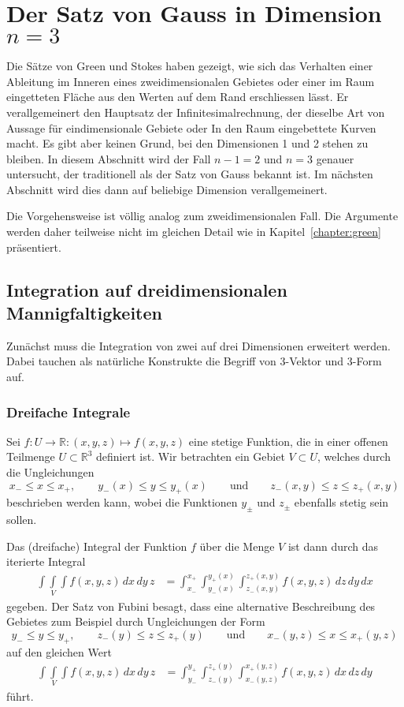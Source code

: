 %
%
\section{Der Satz von Gauss in Dimension $n=3$
\label{buch:gauss:section:dimension3}}
Die Sätze von Green und Stokes haben gezeigt, wie sich das Verhalten
einer Ableitung im Inneren eines zweidimensionalen Gebietes oder
einer im Raum eingetteten Fläche aus den Werten auf dem Rand erschliessen
lässt.
Er verallgemeinert den Hauptsatz der Infinitesimalrechnung, der dieselbe
Art von Aussage für eindimensionale Gebiete oder In den Raum eingebettete
Kurven macht.
Es gibt aber keinen Grund, bei den Dimensionen 1 und 2 stehen zu bleiben.
In diesem Abschnitt wird der Fall $n-1=2$ und $n=3$ genauer untersucht,
der traditionell als der Satz von Gauss bekannt ist.
Im nächsten Abschnitt wird dies dann auf beliebige Dimension verallgemeinert.

Die Vorgehensweise ist völlig analog zum zweidimensionalen Fall.
Die Argumente werden daher teilweise nicht im gleichen Detail
wie in Kapitel~\ref{chapter:green} präsentiert.

%
%
\subsection{Integration auf dreidimensionalen Mannigfaltigkeiten}
Zunächst muss die Integration von zwei auf drei Dimensionen erweitert
werden.
Dabei tauchen als natürliche Konstrukte die Begriff von 3-Vektor und
3-Form auf.

\subsubsection{Dreifache Integrale}
Sei $f\colon U\to\mathbb{R}:(x,y,z)\mapsto f(x,y,z)$ eine
stetige Funktion, die in einer offenen Teilmenge $U\subset\mathbb{R}^3$
definiert ist.
Wir betrachten ein Gebiet $V\subset U$, welches
durch die Ungleichungen
\[
x_-\le x \le x_+,
\qquad
y_-(x)\le y\le y_+(x)
\qquad\text{und}\qquad
z_-(x,y)\le z\le z_+(x,y)
\]
beschrieben werden kann, wobei die Funktionen $y_{\pm}$ und $z_{\pm}$
ebenfalls stetig sein sollen.

Das (dreifache) Integral der Funktion $f$ über die Menge $V$ ist dann durch 
das iterierte Integral
\begin{align}
\underset{V}{\int\!\!\!\int\!\!\!\int}
f(x,y,z)\,dx\,dy\,z
&=
\int_{x_-}^{x_+}
\int_{y_-(x)}^{y_+(x)}
\int_{z_-(x,y)}^{z_+(x,y)}
f(x,y,z)
\,dz
\,dy
\,dx
\label{buch:gauss:3d:eqn:integral}
\end{align}
gegeben.
Der Satz von Fubini besagt, dass eine alternative Beschreibung des
Gebietes zum Beispiel durch Ungleichungen der Form
\[
y_-\le y \le y_+,
\qquad
z_-(y)\le z\le z_+(y)
\qquad\text{und}\qquad
x_-(y,z)\le x\le x_+(y,z)
\]
auf den gleichen Wert
\begin{align*}
\underset{V}{\int\!\!\!\int\!\!\!\int}
f(x,y,z)\,dx\,dy\,z
&=
\int_{y_-}^{y_+}
\int_{z_-(y)}^{z_+(y)}
\int_{x_-(y,z)}^{x_+(y,z)}
f(x,y,z)
\,dx
\,dz
\,dy
\end{align*}
führt.

